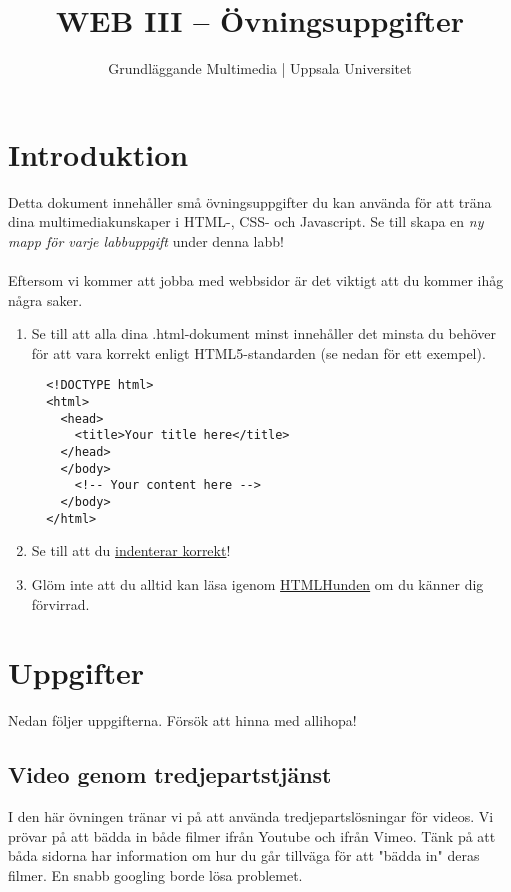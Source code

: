 \documentclass{article}
\begin{document}
  \title{ WEB III -- Övningsuppgifter }
  \author{ Grundläggande Multimedia | Uppsala Universitet }
  \date{}
  \maketitle


  \section{ Introduktion }
    Detta dokument innehåller små övningsuppgifter du kan använda för att träna dina multimediakunskaper i HTML-, CSS- och Javascript. Se till skapa en \emph{ny mapp för varje labbuppgift} under denna labb!


  \paragraph{}
  Eftersom vi kommer att jobba med webbsidor är det viktigt att du kommer ihåg några saker.
    \begin{enumerate}
      \item Se till att alla dina .html-dokument minst innehåller det minsta du behöver för att vara korrekt enligt HTML5-standarden (se nedan för ett exempel).
            \lstset{language=HTML}
            \begin{lstlisting}
  <!DOCTYPE html>
  <html>
    <head>
      <title>Your title here</title>
    </head>
    </body>
      <!-- Your content here -->
    </body>
  </html>
            \end{lstlisting}
      \item Se till att du \href{http://htmlhunden.se/#indentering}{indenterar korrekt}!
      \item Glöm inte att du alltid kan läsa igenom \href{http://htmlhunden.se}{HTMLHunden} om du känner dig förvirrad.
    \end{enumerate}





  \section{ Uppgifter }
  Nedan följer uppgifterna. Försök att hinna med allihopa!




  \subsection{ Video genom tredjepartstjänst }
    I den här övningen tränar vi på att använda tredjepartslösningar för videos. Vi prövar på att bädda in både filmer ifrån Youtube och ifrån Vimeo. Tänk på att båda sidorna har information om hur du går tillväga för att "bädda in" deras filmer. En snabb googling borde lösa problemet.
\end{document}
